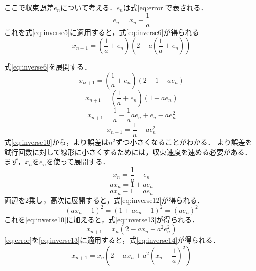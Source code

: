 \documentclass[a4paper,11pt,dvipdfmx]{jsarticle}
\begin{document}
ここで収束誤差$e_n$について考える．$e_n$は式\eqref{eq:error}で表される．
\begin{equation}
  \label{eq:error}
  e_n = x_n - \frac{1}{a}
\end{equation}
これを式\eqref{eq:inverse5}に適用すると，式\eqref{eq:inverse6}が得られる
\begin{equation}
  \label{eq:inverse6}
  x_{n+1} = (\frac{1}{a} + e_n)(2 - a(\frac{1}{a} + e_n))
\end{equation}

式\eqref{eq:inverse6}を展開する．
\begin{equation}
  \label{eq:inverse7}
  x_{n+1} = (\frac{1}{a} + e_n)(2 - 1 -ae_n)
\end{equation}
\begin{equation}
  \label{eq:inverse8}
  x_{n+1} = (\frac{1}{a} + e_n)(1 - ae_n)
\end{equation}
\begin{equation}
  \label{eq:inverse9}
  x_{n+1} = \frac{1}{a} - \frac{1}{a}ae_n + e_n - a e_n^2
\end{equation}
\begin{equation}
  \label{eq:inverse10}
  x_{n+1} = \frac{1}{a} - a e_n^2
\end{equation}
式\eqref{eq:inverse10}から，より誤差は$n^2$ずつ小さくなることがわかる．
より誤差を試行回数に対して線形に小さくするためには，収束速度を速める必要がある．
まず，$x_n$を$e_n$を使って展開する．
\begin{equation}
  \label{eq:inverse11}
  x_n = \frac{1}{a} + e_n
\end{equation}
\begin{equation}
    ax_n = 1 + ae_n
\end{equation}
\begin{equation}
    ax_n - 1 = ae_n
\end{equation}
両辺を2乗し，高次に展開すると，式\eqref{eq:inverse12}が得られる．
\begin{equation}
  \label{eq:inverse12}
  (ax_n - 1)^2 = (1 + ae_n - 1)^2 = (ae_n)^2
\end{equation}
    これを\eqref{eq:inverse10}に加えると，式\eqref{eq:inverse13}が得られる．
\begin{equation}
    \label{eq:inverse13}
    x_{n+1} = x_n(2 - ax_n + a^2e_n^2)
\end{equation}
\eqref{eq:error}を\eqref{eq:inverse13}に適用すると，式\eqref{eq:inverse14}が得られる．
\begin{equation}
    \label{eq:inverse14}
    x_{n+1} = x_n(2 - ax_n + a^2(x_n - \frac{1}{a})^2)
\end{equation}
\end{document}
